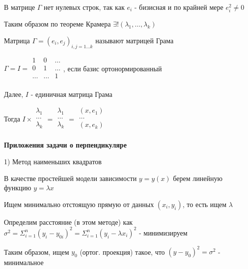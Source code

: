\documentclass[12pt]{article}
\begin{document}
    \Nota В матрице $\Gamma$ нет нулевых строк, так как $\displaystyle e_i$ - бизисная и по крайней мере $\displaystyle e_i^2 \neq 0$

    Таким образом по теореме Крамера $\displaystyle \exists! (\lambda_1, \dots, \lambda_k)$

    \Def Матрица $\displaystyle \Gamma = {(e_i, e_j)}_{i, j = 1\dots k}$ называют матрицей Грама

    $\Gamma = I = \begin{array}{|ccc|}
    1 & 0 & \ldots\\
    0 & 1 & \ldots\\
    \ldots & \ldots & 1\\
    \end{array}$, если базис ортонормированный

    Далее, $I$ - единичная матрица Грама

    \Nota Тогда $\displaystyle I \times \begin{array}{|c|}
    \lambda_1\\
    \ldots\\
    \lambda_k \\
    \end{array} = \begin{array}{|c|}
    \lambda_1\\
    \ldots\\
    \lambda_k \\
    \end{array} = \begin{array}{|c|}
    (x,e_1)\\
    \ldots\\
    (x,e_k) \\
    \end{array}$

    \vspace{5mm}

    \textbf{Приложения задачи о перпендикуляре}

    1) Метод наименьших квадратов

    В качестве простейшей модели зависимости $y = y(x)$ берем линейную функцию $y = \lambda x$

    Ищем минимально отстоящую прямую от данных $\displaystyle (x_i, y_i)$, то есть ищем $\lambda$

    Определим расстояние (в этом методе) как $\displaystyle \sigma^2 = \Sigma^n_{i=1} (y_i - y_{0i})^2 = \Sigma^n_{i=1} (y_i - \lambda x_i)^2$ - минимизируем

    Таким образом, ищем $\displaystyle y_0$ (ортог. проекция) такое, что $\displaystyle (y - y_0)^2 = \sigma^2$ - минимальное
\end{document}

